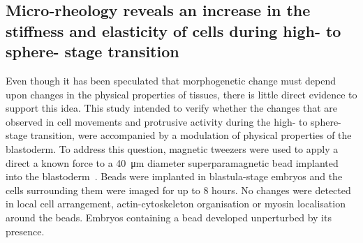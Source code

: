 \subsection{Micro-rheology reveals an increase in the stiffness and elasticity of cells during high- to sphere- stage transition}

Even though it has been speculated that morphogenetic change must depend upon changes in the physical properties of tissues, there is little direct evidence to support this idea.
This study intended to verify whether the changes that are observed in cell movements and protrusive activity during the high- to sphere-stage transition, were accompanied by a modulation of physical properties of the blastoderm.
To address this question, magnetic tweezers were used to apply a direct a known force to a \SI{40}{\micro\meter} diameter superparamagnetic bead implanted into the blastoderm~\cite{fisherThreedimensionalForceMicroscope2005}. %
Beads were implanted in blastula-stage embryos and the cells surrounding them were imaged for up to 8 hours.
No changes were detected in local cell arrangement, actin-cytoskeleton organisation or myosin localisation around the beads.
Embryos containing a bead developed unperturbed by its presence.


